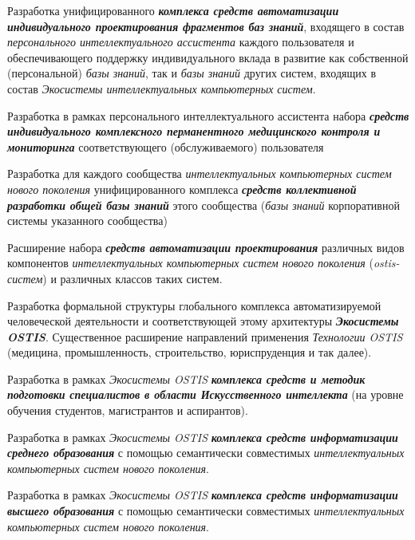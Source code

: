 \begin{textitemize}
	Разработка унифицированного \textbf{\textit{комплекса средств автоматизации индивидуального проектирования фрагментов баз знаний}}, входящего в состав \textit{персонального интеллектуального ассистента} каждого пользователя и обеспечивающего поддержку индивидуального вклада в развитие как собственной (персональной) \textit{базы знаний}, так и \textit{базы знаний} других систем, входящих в состав \textit{Экосистемы интеллектуальных компьютерных систем}. 
	\item
	Разработка в рамках персонального интеллектуального ассистента набора \textbf{\textit{средств индивидуального комплексного перманентного медицинского контроля и мониторинга}} соответствующего (обслуживаемого) пользователя
	
	\item Разработка для каждого сообщества \textit{интеллектуальных компьютерных систем нового поколения} унифицированного комплекса \textbf{\textit{средств коллективной разработки общей базы знаний}} этого сообщества (\textit{базы знаний} корпоративной системы указанного сообщества)
	\item Расширение набора \textbf{\textit{средств автоматизации проектирования}} различных видов компонентов \textit{интеллектуальных компьютерных систем нового поколения} (\textit{ostis-систем}) и различных классов таких систем.
	
	\item Разработка формальной структуры глобального комплекса автоматизируемой человеческой деятельности и соответствующей этому архитектуры \textbf{\textit{Экосистемы OSTIS}}. Существенное расширение направлений применения \textit{Технологии OSTIS} (медицина, промышленность, строительство, юриспруденция и так далее).
	
	\item Разработка в рамках \textit{Экосистемы OSTIS} \textbf{\textit{комплекса средств и методик подготовки специалистов в области Искусственного интеллекта}} (на уровне обучения студентов, магистрантов и аспирантов).

	\item Разработка в рамках \textit{Экосистемы OSTIS} \textbf{\textit{комплекса средств информатизации среднего образования}} с помощью семантически совместимых \textit{интеллектуальных компьютерных систем нового поколения}.
	\item Разработка в рамках \textit{Экосистемы OSTIS} \textbf{\textit{комплекса средств информатизации высшего  образования}} с помощью семантически совместимых \textit{интеллектуальных компьютерных систем нового поколения}.
\end{textitemize}